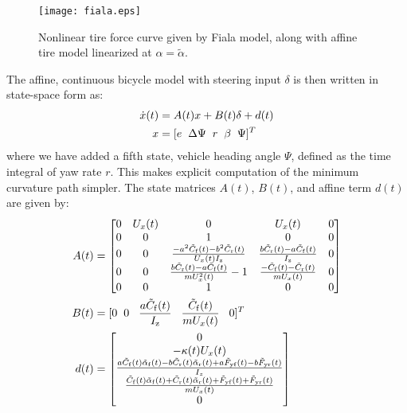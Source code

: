 \begin{figure}[h]
\centering
\texttt{[image: fiala.eps]}
\caption{Nonlinear tire force curve given by Fiala model, along with affine tire model linearized at $\alpha = \tilde{\alpha}$. }
\label{fig:fiala}
\end{figure}

The affine, continuous bicycle model with
steering input $\delta$ is then written in state-space form as:
\begin{subequations}
\label{eq:cts}
\begin{align}
	\dot{x}(t) &= A(t) x + B(t)\delta + d(t)\\
	 x &= [e \hspace{2mm} \Delta\Psi \hspace{2mm} r \hspace{2mm} \beta \hspace{2mm} \Psi]^T
\end{align}
\end{subequations}
where we have added a fifth state, vehicle heading angle $\Psi$, defined as the time integral of yaw rate $r$.
 This makes explicit computation of the minimum curvature path simpler. The state matrices $A(t)$, $B(t)$, and affine term $d(t)$ 
 are given by:
\begin{align}
A(t)  &= \left[\begin{matrix}
  0 & U_x(t) & 0 & U_x(t) & 0\\ 
  0 & 0 & 1 & 0 & 0 \\ 
  0 & 0  & \frac{-a^2\tilde{C}_\mathrm{f}(t)-b^2\tilde{C}_\mathrm{r}(t)}{U_x(t)I_\mathrm{z}} & \frac{b\tilde{C}_\mathrm{r}(t) - a\tilde{C}_\mathrm{f}(t)}{I_\mathrm{z}} & 0 \\
  0 & 0  & \frac{b\tilde{C}_\mathrm{r}(t)-a\tilde{C}_\mathrm{f}(t)}{mU_x^2(t)}-1 & \frac{-\tilde{C}_\mathrm{f}(t) - \tilde{C}_\mathrm{r}(t)}{mU_x(t)} & 0 \\
  0 & 0 & 1 & 0 & 0
 \end{matrix}\right] \\
B(t) &=[0 \hspace{2 mm} 0 \hspace{3 mm} \frac{a \tilde{C}_\mathrm{f}(t)}{I_\mathrm{z}} \hspace{3 mm}  \frac{\tilde{C}_\mathrm{f}(t)}{mU_x(t)} \hspace{3mm} 0]^T \\
d(t) &= \left[\begin{matrix} 0 \\
               -\kappa(t) U_x(t) \\ 
			    \frac{a\tilde{C}_\mathrm{f}(t)\tilde{\alpha}_\mathrm{f}(t) - b\tilde{C}_\mathrm{r}(t)\tilde{\alpha}_\mathrm{r}(t) + a\tilde{F}_\mathrm{yf}(t) - b\tilde{F}_\mathrm{yr}(t)}{I_z} \\
				\frac{\tilde{C}_\mathrm{f}(t)\tilde{\alpha}_\mathrm{f}(t) + \tilde{C}_\mathrm{r}(t)\tilde{\alpha}_\mathrm{r}(t) + \tilde{F}_\mathrm{yf}(t) + \tilde{F}_\mathrm{yr}(t)}{mU_x(t)}\\
				0
				\end{matrix}\right]
\end{align}

